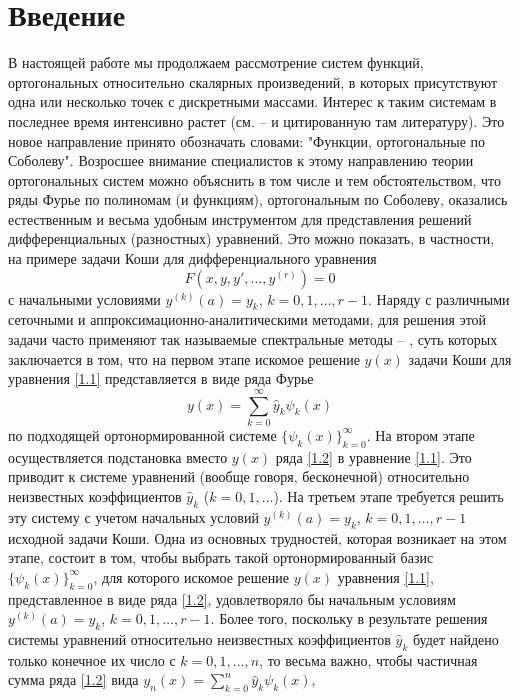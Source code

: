 \section{Введение}
В настоящей работе мы продолжаем рассмотрение систем функций, ортогональных относительно скалярных произведений, в которых присутствуют одна или несколько точек  с дискретными массами. Интерес к таким системам  в последнее время интенсивно растет  (см. \cite{Shar2016} -- \cite{Shar13}  и цитированную там литературу).
 Это новое направление принято обозначать словами: "Функции, ортогональные по Соболеву". Возросшее  внимание специалистов  к этому направлению теории ортогональных систем можно объяснить в том числе и тем обстоятельством, что ряды Фурье по полиномам (и функциям), ортогональным по Соболеву, оказались естественным и весьма удобным инструментом для представления решений  дифференциальных (разностных) уравнений. Это можно показать, в частности, на примере  задачи Коши для  дифференциального уравнения
\begin{equation}\label{1.1}
F(x,y,y',\ldots,y^{(r)})=0
 \end{equation}
с начальными условиями $y^{(k)}(a)=y_k$, $k=0,1,\ldots,r-1$.  Наряду с различными сеточными и аппроксимационно-аналитическими методами, для решения этой задачи часто применяют так называемые спектральные методы \cite{Tref1} -- \cite{Shar18}, суть которых  заключается в том, что на первом этапе искомое решение $y(x)$ задачи Коши для уравнения \eqref{1.1} представляется в виде ряда Фурье
\begin{equation}\label{1.2}
 y(x)=\sum_{k=0}^\infty \hat y_k\psi_k(x)
 \end{equation}
по подходящей ортонормированной системе $\{\psi_k(x)\}_{k=0}^\infty$. На втором этапе осуществляется подстановка вместо $y(x)$ ряда \eqref{1.2} в уравнение \eqref{1.1}. Это приводит к системе уравнений (вообще говоря, бесконечной) относительно неизвестных коэффициентов $\hat y_k$ ($k=0,1,\ldots$). На третьем этапе требуется решить эту систему с учетом начальных условий  $y^{(k)}(a)=y_k$, $k=0,1,\ldots,r-1$ исходной задачи Коши.
Одна из основных трудностей, которая возникает на этом этапе, состоит в том, чтобы
выбрать такой ортонормированный базис $\{\psi_k(x)\}_{k=0}^\infty$, для которого искомое решение $y(x)$ уравнения \eqref{1.1}, представленное в виде ряда  \eqref{1.2}, удовлетворяло бы начальным условиям $y^{(k)}(a)=y_k$, $k=0,1,\ldots,r-1$. Более того, поскольку в результате решения системы уравнений относительно неизвестных коэффициентов $\hat y_k$  будет найдено только конечное их число с $k=0,1,\ldots, n$, то весьма важно, чтобы частичная сумма ряда \eqref{1.2} вида $ y_n(x)=\sum_{k=0}^n\hat y_k\psi_k(x)$,
